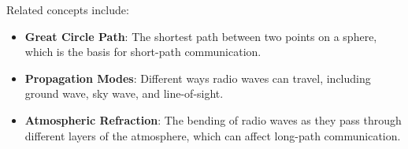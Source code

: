 Related concepts include:
\begin{itemize}
    \item \textbf{Great Circle Path}: The shortest path between two points on a sphere, which is the basis for short-path communication.
    \item \textbf{Propagation Modes}: Different ways radio waves can travel, including ground wave, sky wave, and line-of-sight.
    \item \textbf{Atmospheric Refraction}: The bending of radio waves as they pass through different layers of the atmosphere, which can affect long-path communication.
\end{itemize}

